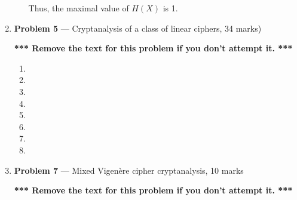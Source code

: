 \documentclass[11pt]{article}
\theoremstyle{definition}
\begin{document}
\begin{enumerate}
\begin{enumerate}
Thus, the maximal value of $H(X)$ is 1.

\end{enumerate}

\newpage

\item[] \textbf{Problem 5} --- Cryptanalysis of a class of linear ciphers, 34 marks)

\textbf{*** Remove the text for this problem if you don't attempt it. ***}

\begin{enumerate}
\item
\item
\item
\item
\item
\item
\item
\item
\end{enumerate}

\newpage

\item[] \textbf{Problem 7} --- Mixed Vigen\`ere cipher cryptanalysis, 10 marks

\textbf{*** Remove the text for this problem if you don't attempt it. ***}


\end{enumerate}
\end{document}
